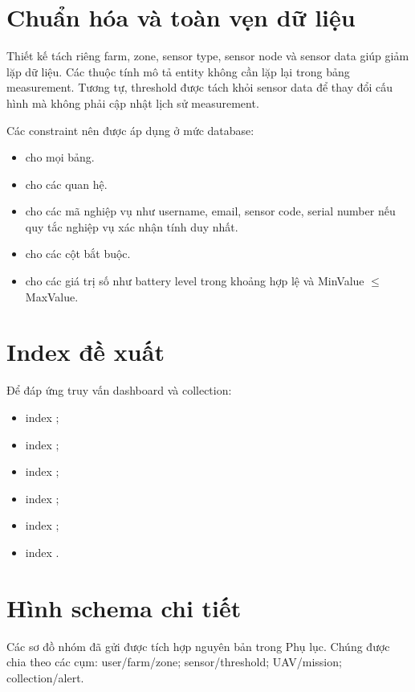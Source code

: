 \section{Chuẩn hóa và toàn vẹn dữ liệu}
Thiết kế tách riêng farm, zone, sensor type, sensor node và sensor data giúp giảm lặp dữ liệu. Các thuộc tính mô tả entity không cần lặp lại trong bảng measurement. Tương tự, threshold được tách khỏi sensor data để thay đổi cấu hình mà không phải cập nhật lịch sử measurement.

Các constraint nên được áp dụng ở mức database:
\begin{itemize}
  \item {} cho mọi bảng.
  \item {} cho các quan hệ.
  \item {} cho các mã nghiệp vụ như username, email, sensor code, serial number nếu quy tắc nghiệp vụ xác nhận tính duy nhất.
  \item {} cho các cột bắt buộc.
  \item {} cho các giá trị số như battery level trong khoảng hợp lệ và MinValue $\le$ MaxValue.
\end{itemize}

\section{Index đề xuất}
Để đáp ứng truy vấn dashboard và collection:
\begin{itemize}
  \item index ;
  \item index ;
  \item index ;
  \item index ;
  \item index ;
  \item index .
\end{itemize}

\section{Hình schema chi tiết}
Các sơ đồ nhóm đã gửi được tích hợp nguyên bản trong Phụ lục. Chúng được chia theo các cụm: user/farm/zone; sensor/threshold; UAV/mission; collection/alert.
